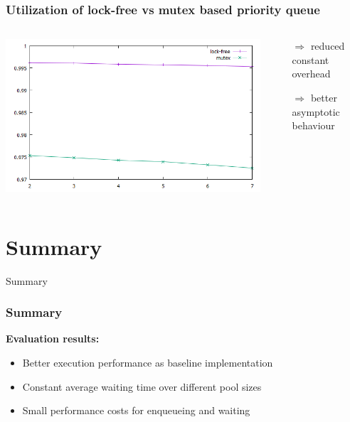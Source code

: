 \documentclass{beamer}
\begin{document}
\begin{frame}
	\frametitle{Utilization of lock-free vs mutex based priority queue}
	\begin{columns}
		\begin{column}{0.76\textwidth}
			\includegraphics[width=1.0\textwidth]{img/lock_free.png}
		\end{column}
		\begin{column}{0.24\textwidth}
			\begin{itemize}
				\item[$\Rightarrow$] reduced constant overhead
				\item[$\Rightarrow$] better asymptotic behaviour
			\end{itemize}
		\end{column}
	\end{columns}
\end{frame}

\section{Summary}
\begin{frame}
	\begin{center}
		\huge Summary
	\end{center}
\end{frame}

\begin{frame}
	\frametitle{Summary}
	\textbf{Evaluation results:}
	\begin{itemize}
		\item Better execution performance as baseline implementation
		\item Constant average waiting time over different pool sizes
		\item Small performance costs for enqueueing and waiting
	\end{itemize}
\end{frame}
\end{document}
